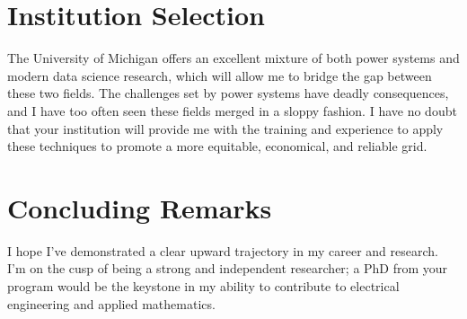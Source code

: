 \documentclass[letterpaper]{article}
\begin{document}
\section*{Institution Selection}
The University of Michigan offers an excellent mixture of both power systems
and modern data science research, which will allow me to bridge the gap between these
two fields. The challenges set by power systems have deadly consequences, and I have too
often seen these fields merged in a sloppy fashion. I have no doubt that your institution
will provide me with the training and experience to apply these techniques to promote
a more equitable, economical, and reliable grid.

\section*{Concluding Remarks}
I hope I've demonstrated a clear upward trajectory in my career and research.
I'm on the cusp of being a strong and independent researcher; a PhD from your program
would be the keystone in my ability to contribute to electrical engineering and applied
mathematics.
\end{document}
